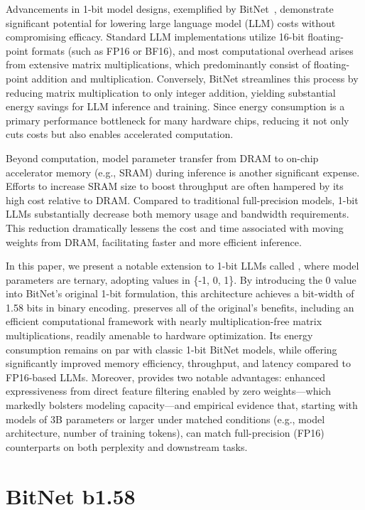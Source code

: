 Advancements in 1-bit model designs, exemplified by BitNet~\cite{bitnet}, demonstrate significant potential for lowering large language model (LLM) costs without compromising efficacy. Standard LLM implementations utilize 16-bit floating-point formats (such as FP16 or BF16), and most computational overhead arises from extensive matrix multiplications, which predominantly consist of floating-point addition and multiplication. Conversely, BitNet streamlines this process by reducing matrix multiplication to only integer addition, yielding substantial energy savings for LLM inference and training. Since energy consumption is a primary performance bottleneck for many hardware chips, reducing it not only cuts costs but also enables accelerated computation.

Beyond computation, model parameter transfer from DRAM to on-chip accelerator memory (e.g., SRAM) during inference is another significant expense. Efforts to increase SRAM size to boost throughput are often hampered by its high cost relative to DRAM. Compared to traditional full-precision models, 1-bit LLMs substantially decrease both memory usage and bandwidth requirements. This reduction dramatically lessens the cost and time associated with moving weights from DRAM, facilitating faster and more efficient inference.

In this paper, we present a notable extension to 1-bit LLMs called \textbf{}, where model parameters are ternary, adopting values in \{-1, 0, 1\}. By introducing the 0 value into BitNet's original 1-bit formulation, this architecture achieves a bit-width of 1.58 bits in binary encoding.  preserves all of the original's benefits, including an efficient computational framework with nearly multiplication-free matrix multiplications, readily amenable to hardware optimization. Its energy consumption remains on par with classic 1-bit BitNet models, while offering significantly improved memory efficiency, throughput, and latency compared to FP16-based LLMs. Moreover,  provides two notable advantages: enhanced expressiveness from direct feature filtering enabled by zero weights—which markedly bolsters modeling capacity—and empirical evidence that, starting with models of 3B parameters or larger under matched conditions (e.g., model architecture, number of training tokens),  can match full-precision (FP16) counterparts on both perplexity and downstream tasks.

\section{BitNet b1.58}

